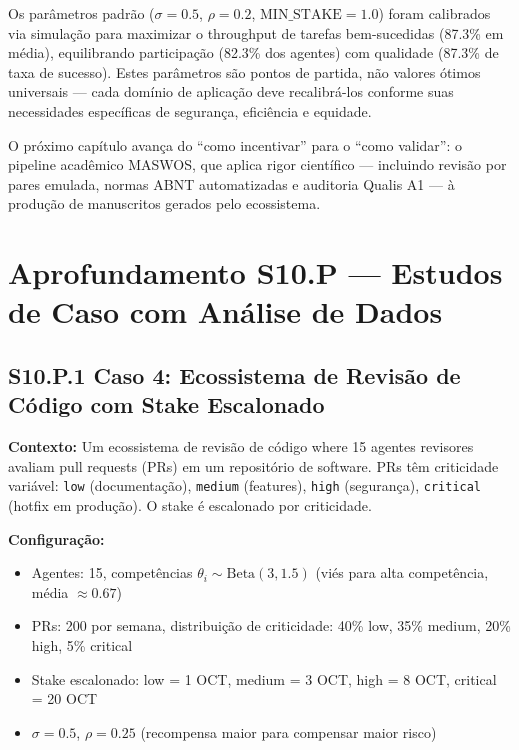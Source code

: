 Os parâmetros padrão ($\sigma = 0.5$, $\rho = 0.2$, $\text{MIN\_STAKE} = 1.0$) foram calibrados via simulação para maximizar o throughput de tarefas bem-sucedidas (87.3\% em média), equilibrando participação (82.3\% dos agentes) com qualidade (87.3\% de taxa de sucesso). Estes parâmetros são pontos de partida, não valores ótimos universais --- cada domínio de aplicação deve recalibrá-los conforme suas necessidades específicas de segurança, eficiência e equidade.

O próximo capítulo avança do ``como incentivar'' para o ``como validar'': o pipeline acadêmico MASWOS, que aplica rigor científico --- incluindo revisão por pares emulada, normas ABNT automatizadas e auditoria Qualis A1 --- à produção de manuscritos gerados pelo ecossistema.


\section*{Aprofundamento S10.P --- Estudos de Caso com Análise de Dados}

\subsection*{S10.P.1 Caso 4: Ecossistema de Revisão de Código com Stake Escalonado}

\textbf{Contexto:} Um ecossistema de revisão de código where 15 agentes revisores avaliam pull requests (PRs) em um repositório de software. PRs têm criticidade variável: \texttt{low} (documentação), \texttt{medium} (features), \texttt{high} (segurança), \texttt{critical} (hotfix em produção). O stake é escalonado por criticidade.

\textbf{Configuração:}
\begin{itemize}
    \item Agentes: 15, competências $\theta_i \sim \text{Beta}(3, 1.5)$ (viés para alta competência, média $\approx 0.67$)
    \item PRs: 200 por semana, distribuição de criticidade: 40\% low, 35\% medium, 20\% high, 5\% critical
    \item Stake escalonado: low = 1 OCT, medium = 3 OCT, high = 8 OCT, critical = 20 OCT
    \item $\sigma = 0.5$, $\rho = 0.25$ (recompensa maior para compensar maior risco)
\end{itemize}

